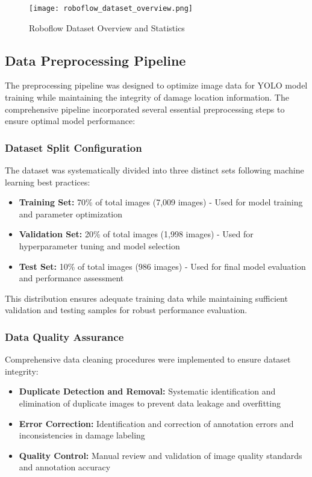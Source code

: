 \documentclass[12pt,a4paper]{report}
\begin{document}
\begin{figure}[H]
    \centering
    \texttt{[image: roboflow\_dataset\_overview.png]}
    \caption{Roboflow Dataset Overview and Statistics}
    \label{fig:roboflow_dataset}
\end{figure}





\subsection{Data Preprocessing Pipeline}

The preprocessing pipeline was designed to optimize image data for YOLO model training while maintaining the integrity of damage location information. The comprehensive pipeline incorporated several essential preprocessing steps to ensure optimal model performance:

\subsubsection{Dataset Split Configuration}

The dataset was systematically divided into three distinct sets following machine learning best practices:

\begin{itemize}
    \item \textbf{Training Set:} 70\% of total images (7,009 images) - Used for model training and parameter optimization
    \item \textbf{Validation Set:} 20\% of total images (1,998 images) - Used for hyperparameter tuning and model selection
    \item \textbf{Test Set:} 10\% of total images (986 images) - Used for final model evaluation and performance assessment
\end{itemize}

This distribution ensures adequate training data while maintaining sufficient validation and testing samples for robust performance evaluation.

\subsubsection{Data Quality Assurance}

Comprehensive data cleaning procedures were implemented to ensure dataset integrity:

\begin{itemize}
    \item \textbf{Duplicate Detection and Removal:} Systematic identification and elimination of duplicate images to prevent data leakage and overfitting
    \item \textbf{Error Correction:} Identification and correction of annotation errors and inconsistencies in damage labeling
    \item \textbf{Quality Control:} Manual review and validation of image quality standards and annotation accuracy
\end{itemize}
\end{document}

